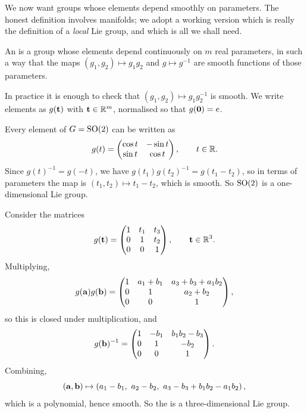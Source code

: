 \documentclass[a4paper]{scrartcl}
\begin{document}
We now want groups whose elements depend smoothly on parameters. The honest definition involves manifolds; we adopt a working version which is really the definition of a \emph{local} Lie group, and which is all we shall need.

\begin{definition}
	An  is a group whose elements depend continuously on $m$ real parameters, in such a way that the maps $(g_1,g_2)\mapsto g_1g_2$ and $g\mapsto g^{-1}$ are smooth functions of those parameters.
\end{definition}

In practice it is enough to check that $(g_1,g_2)\mapsto g_1g_2^{-1}$ is smooth. We write elements as $g(\mathbf{t})$ with $\mathbf{t}\in\mathbb{R}^m$, normalised so that $g(\mathbf{0}) = e$.

\begin{example}
	Every element of $G = \operatorname{SO}(2)$ can be written as
	$$
	g(t) = \begin{pmatrix}\cos t & -\sin t\\ \sin t & \cos t\end{pmatrix}, \qquad t\in\mathbb{R}.
	$$
	Since $g(t)^{-1} = g(-t)$, we have $g(t_1)g(t_2)^{-1} = g(t_1 - t_2)$, so in terms of parameters the map is $(t_1,t_2)\mapsto t_1 - t_2$, which is smooth. So $\operatorname{SO}(2)$ is a one-dimensional Lie group.
\end{example}

\begin{example}
	Consider the matrices
	$$
	g(\mathbf{t}) = \begin{pmatrix}1 & t_1 & t_3\\ 0 & 1 & t_2\\ 0&0&1\end{pmatrix}, \qquad \mathbf{t}\in\mathbb{R}^3.
	$$
	Multiplying,
	$$
	g(\mathbf{a})g(\mathbf{b}) = \begin{pmatrix}1 & a_1+b_1 & a_3+b_3+a_1b_2\\ 0 & 1 & a_2+b_2\\ 0&0&1\end{pmatrix},
	$$
	so this is closed under multiplication, and
	$$
	g(\mathbf{b})^{-1} = \begin{pmatrix}1 & -b_1 & b_1b_2-b_3\\ 0&1&-b_2\\ 0&0&1\end{pmatrix}.
	$$
	Combining,
	$$
	(\vv a, \vv b)\mapsto \left(a_1 - b_1,\ a_2-b_2,\ a_3 - b_3 + b_1b_2 - a_1b_2\right),
	$$
	which is a polynomial, hence smooth. So the  is a three-dimensional Lie group.
\end{example}
\end{document}
